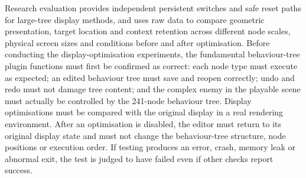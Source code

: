 Research evaluation provides independent persistent switches and safe reset paths for large-tree display methods, and uses raw data to compare geometric presentation, target location and context retention across different node scales, physical screen sizes and conditions before and after optimisation. Before conducting the display-optimisation experiments, the fundamental behaviour-tree plugin functions must first be confirmed as correct: each node type must execute as expected; an edited behaviour tree must save and reopen correctly; undo and redo must not damage tree content; and the complex enemy in the playable scene must actually be controlled by the 241-node behaviour tree. Display optimisations must be compared with the original display in a real rendering environment. After an optimisation is disabled, the editor must return to its original display state and must not change the behaviour-tree structure, node positions or execution order. If testing produces an error, crash, memory leak or abnormal exit, the test is judged to have failed even if other checks report success.
